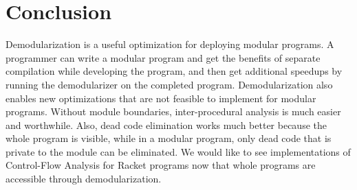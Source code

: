 \chapter{Conclusion}
\label{chap:conclusion}

Demodularization is a useful optimization for deploying modular programs. 
A programmer can write a modular program and get the benefits of separate compilation while developing the program, and then get additional speedups by running the demodularizer on the completed program.
Demodularization also enables new optimizations that are not feasible to implement for modular programs.
Without module boundaries, inter-procedural analysis is much easier and worthwhile.
Also, dead code elimination works much better because the whole program is visible, while in a modular program, only dead code that is private to the module can be eliminated.
We would like to see implementations of Control-Flow Analysis for Racket programs now that whole programs are accessible through demodularization.

